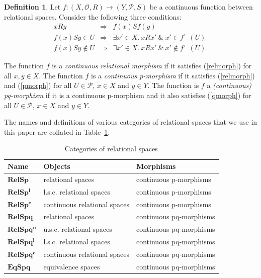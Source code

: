\documentclass{article}[a4paper]
\theoremstyle{definition}
\newtheorem{definition}{Definition}%
\newcommand{\Ocal}{\mathcal{O}} %
\newcommand{\Pcal}{\mathcal{P}} %
\newcommand{\rels}{\mathbf{RelS}}
\newcommand{\relsp}{\mathbf{RelSp}}
\newcommand{\relspl}{\mathbf{RelSp^l}}
\newcommand{\relspc}{\mathbf{RelSp^c}}
\newcommand{\relspq}{\mathbf{RelSpq}}
\newcommand{\relspqu}{\mathbf{RelSpq^u}}
\newcommand{\relspql}{\mathbf{RelSpq^l}}
\newcommand{\relspqc}{\mathbf{RelSpq^c}}
\newcommand{\eqspq}{\mathbf{EqSpq}}
\newcommand{\invim}{^{\leftarrow}} %
\begin{document}
\begin{definition} 
Let 
$f:(X,\Ocal, R ) \rightarrow (Y, \Pcal , S )$ be a continuous function between relational spaces. 
Consider the following three conditions:
\begin{eqnarray}
\label{relmorph}
x R y & \Rightarrow & f(x) S f(y)  \\
\label{pmorph} 
 f(x) S y \in U & \Rightarrow &  
            \exists x' \in X. ~ x R x' ~ \& ~ x' \in f \invim (U) \\
\label{qmorph}
f(x)S y \notin U  & \Rightarrow &  
                  \exists x' \in X. \ xR x' \ \& \ x' \notin f \invim (U) .
\end{eqnarray}

The function $f$ is a \emph{continuous relational morphism} if it satisfies (\ref{relmorph}) for all $x,y \in X$.
The function $f$ is a \emph{continuous p-morphism} if it satisfies (\ref{relmorph}) and (\ref{pmorph}) for all $U \in \Pcal$, $x\in X$ and $y \in Y$.  
The function is $f$ a \emph{(continuous) pq-morphism} if it is a continuous p-morphism and it also satisfies (\ref{qmorph}) for all $U \in \Pcal$, $x \in X$ and $y \in Y$. 

The names and definitions of various categories of relational spaces that we use in this paper are collated in Table~\ref{table:spaces}. 
\begin{table}[ht]
\begin{center}
\begin{tabular}{|l|l|l|}
\hline
Name    & Objects  & Morphisms \\ 
\hline
$\relsp$   & relational spaces & continuous p-morphisms \\
$\relspl$   & l.s.c. relational spaces & continuous p-morphisms\\
$\relspc$   & continuous relational spaces & continuous p-morphisms\\
$\relspq$  & relational spaces & continuous pq-morphisms \\ 
$\relspqu$ & u.s.c. relational spaces & continuous pq-morphisms \\ 
$\relspql$ & l.s.c. relational spaces & continuous pq-morphisms \\
$\relspqc$ & continuous relational spaces & continuous pq-morphisms \\
$\eqspq$  & equivalence spaces & continuous pq-morphisms \\
\hline
\end{tabular}
\caption{Categories of relational spaces}
\label{table:spaces}
\end{center}
\end{table}
\end{definition}
\end{document}
